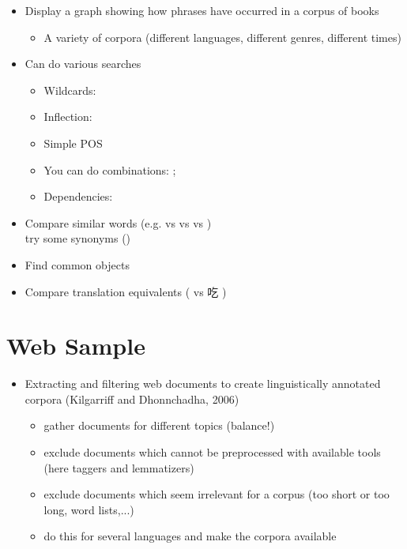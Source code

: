 \documentclass[a4paper,landscape,headrule,footrule,xetex]{foils}
\begin{document}
\begin{itemize}
\item Display a graph showing how phrases have occurred in a corpus of books 
  \begin{itemize}
  \item A variety of corpora (different languages, different genres, different times)
  \end{itemize}
\item Can do various searches
  \begin{itemize}
  \item Wildcards: 
  \item Inflection: 
  \item Simple POS
  \item You can do combinations: ; 
  \item Dependencies: 
  \end{itemize}
\end{itemize}


\begin{itemize}
\item Compare similar words (e.g.  vs  vs  vs )
\\ try some synonyms ()
\item Find common objects
\item Compare translation equivalents ( vs 吃 )
\end{itemize}



\section{Web Sample}
\MyLogo{}
\begin{itemize}
\item Extracting and filtering web documents to create linguistically
  annotated corpora (Kilgarriff and Dhonnchadha, 2006)
  \begin{itemize}
  \item gather documents for different topics (balance!)
  \item exclude documents which cannot be preprocessed with available
    tools (here taggers and lemmatizers)
  \item exclude documents which seem irrelevant for a corpus (too short or
    too long, word lists,...)
  \item do this for several languages and make the corpora available
  \end{itemize}
\end{itemize}
\end{document}
